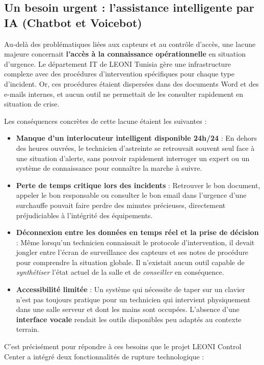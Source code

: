 \documentclass[12pt,a4paper]{report}
\begin{document}
\subsection*{Un besoin urgent : l'assistance intelligente par IA (Chatbot et Voicebot)}

Au-delà des problématiques liées aux capteurs et au contrôle d'accès, une lacune majeure concernait \textbf{l'accès à la connaissance opérationnelle} en situation d'urgence. Le département IT de LEONI Tunisia gère une infrastructure complexe avec des procédures d'intervention spécifiques pour chaque type d'incident. Or, ces procédures étaient dispersées dans des documents Word et des e-mails internes, et aucun outil ne permettait de les consulter rapidement en situation de crise.

Les conséquences concrètes de cette lacune étaient les suivantes :

\begin{itemize}
    \item \textbf{Manque d'un interlocuteur intelligent disponible 24h/24} : En dehors des heures ouvrées, le technicien d'astreinte se retrouvait souvent seul face à une situation d'alerte, sans pouvoir rapidement interroger un expert ou un système de connaissance pour connaître la marche à suivre.
    \item \textbf{Perte de temps critique lors des incidents} : Retrouver le bon document, appeler le bon responsable ou consulter le bon email dans l'urgence d'une surchauffe pouvait faire perdre des minutes précieuses, directement préjudiciables à l'intégrité des équipements.
    \item \textbf{Déconnexion entre les données en temps réel et la prise de décision} : Même lorsqu'un technicien connaissait le protocole d'intervention, il devait jongler entre l'écran de surveillance des capteurs et ses notes de procédure pour comprendre la situation globale. Il n'existait aucun outil capable de \textit{synthétiser} l'état actuel de la salle et de \textit{conseiller} en conséquence.
    \item \textbf{Accessibilité limitée} : Un système qui nécessite de taper sur un clavier n'est pas toujours pratique pour un technicien qui intervient physiquement dans une salle serveur et dont les mains sont occupées. L'absence d'une \textbf{interface vocale} rendait les outils disponibles peu adaptés au contexte terrain.
\end{itemize}

C'est précisément pour répondre à ces besoins que le projet LEONI Control Center a intégré deux fonctionnalités de rupture technologique :
\end{document}
